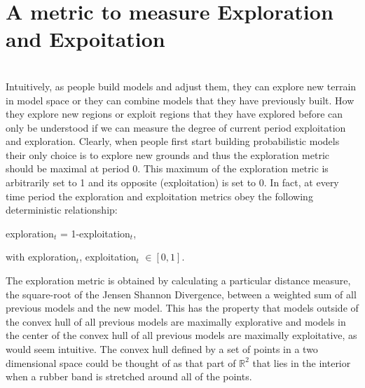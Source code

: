 \section{A metric to measure Exploration and Expoitation}

\\

Intuitively, as people build models and adjust them, they can explore new terrain in model space or they can combine models that they have previously built. How they explore new regions or exploit regions that they have explored before can only be understood if we can measure the degree of current period exploitation and exploration.  Clearly, when people first start building probabilistic models their only choice is to explore new grounds and thus the exploration metric should be maximal at period 0.  This maximum of the exploration metric is arbitrarily set to 1 and its opposite (exploitation) is set to 0.  In fact, at every time period the exploration and exploitation metrics obey the following deterministic relationship: 

exploration$_t$ = 1-exploitation$_t$, 

with exploration$_t$, exploitation$_t$ $\in [0, 1]$. 

The exploration metric is obtained by calculating a particular distance measure, the square-root of the Jensen Shannon Divergence, between a weighted sum of all previous models and the new model. This has the property that models outside of the convex hull of all previous models are maximally explorative and models in the center of the convex hull of all previous models are maximally exploitative, as would seem intuitive.  The convex hull defined by a set of points in a two dimensional space could be thought of as that part of $\mathbb{R}^2$ that lies in the interior when a rubber band is stretched around all of the points. 